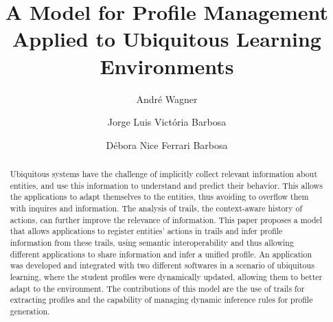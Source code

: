 \documentclass[preprint,authoryear,12pt,dvipdfm]{elsarticle}
\begin{document}
\begin{frontmatter}



\title{A Model for Profile Management Applied to Ubiquitous Learning Environments}


\author[UNISINOS]{André Wagner} 
\author[UNISINOS]{Jorge Luis Victória Barbosa} 
\author[FEEVALE]{Débora Nice Ferrari Barbosa} 

\address[UNISINOS]{University of Vale do Rio dos Sinos (Unisinos) \\
	           Applied Computing Graduate Program (PIPCA) \\
                   Av. Unisinos, 950, São Leopoldo, Brazil}
\address[FEEVALE]{Feevale University\\
                  Inclusion and Diversity Post-graduate Program\\
                  RS-239, 2755, Novo Hamburgo, Brazil}

\begin{abstract}
Ubiquitous systems have the challenge of implicitly collect relevant information about entities, and use this information to understand and predict their behavior. This allows the applications to adapt themselves to the entities, thus avoiding to overflow them with inquires and information. The analysis of trails, the context-aware history of actions, can further improve the relevance of information. This paper proposes a model that allows applications to register entities' actions in trails and infer profile information from these trails, using semantic interoperability and thus allowing different applications to share information and infer a unified profile. An application was developed and integrated with two different softwares in a scenario of ubiquitous learning, where the student profiles were dynamically updated, allowing them to better adapt to the environment. The contributions of this model are the use of trails for extracting profiles and the capability of managing dynamic inference rules for profile generation.
\end{abstract}


\end{frontmatter}
\end{document}
